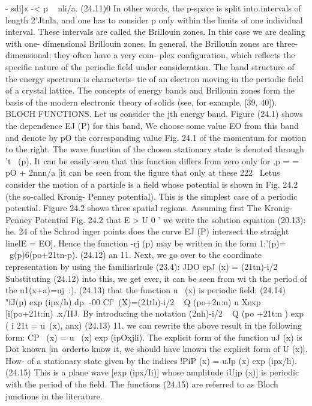 \documentclass[a4paper,sfsidenotes,colorlinks=true]{tufte-book}
\numberwithin{equation}{section}
\numberwithin{figure}{section}
\begin{document}
{{{{{-	sdi]«	-< p	~	nli/a.	(24.11)0
In other words, the p-space is split into intervals of length 2'Jtnla, and one has to consider p only within the limits of one individual interval. These intervals are called the Brillouin zones. In this case we are dealing with one- dimensional Brillouin zones. In general, the Brillouin zones are three-dimensional; they often have a very com- plex configuration, which reflects the specific nature of the periodic field under consideration.
The band structure of the energy spectrum is characteris- tic of an electron moving in the periodic field of a crystal lattice. The concepts of energy bands and Brillouin zones form the basis of the modern electronic theory of solids (see, for example, [39, 40]).
BLOCH FUNCTIONS. Let us consider the jth energy band. Figure (24.1) shows the dependence EJ (P) for this band, We choose some value EO from this band and denote by pO the corresponding value
Fig. 24.1
of the momentum for motion to the right. The wave function of the chosen stationary state is denoted through 't~ (p). It can be
easily seen that this function differs from zero only for ,p = = pO + 2nnn/a [it can be seen from the figure that only at these
222
~Letus consider the motion of a particle is a field whose potential is shown in Fig. 24.2 (the so-called Kronig- Penney potential). This is the simplest case of a periodic potential.
Figure 24.2 shows three spatial regions. Assuming first
The Kronig-Penney Potential
Fig. 24.2
that	E	>	U 0 '	we	write	the	solution equation (20.13):
he. 24
of	the
Schrod inger
points does the curve EJ (P) intersect the straight linelE = EO]. Hence the function -rj (p) may be written in the form
1;'(p)= ~g(p)6(po+21tn-p).	(24.12) an
11.
Next, we go over to the coordinate representation by using the familiarlrule (23.4):
JDO
cpJ (x) =	(21tn)-i/2 Substituting (24.12) into this, we get
ever, it can be seen from wi th	the	period	of	the
u1(x+a)=uj~:).
(24.13) that the function u~ (x) is periodic field:
(24.14)
"fJ(p) exp (ipx/h) dp.
-00
Cf'~(X)=(21th)-i/2 ~ Q (po+2n:n) n
Xexp [i(po+21t:in) .x/IIJ. By introducing the notation
(2nh)-i/2 ~ Q (po +21t:n ) exp ( i 21t	= u~(x), anx)
(24.13)
11. we can rewrite the above result in the following form: CP~ (x) = u~ (x) exp (ipOxjli).
The explicit form of the function uJ (x) is Dot known [in~orderto know it, we should have known the explicit form of U (x)]. How-
of a stationary state given by the indices !PiP (x) = uJp (x) exp (ipx/li).	(24.15)
This is a plane wave [exp (ipx/Ii)] whose amplitude iUjp (x)] is periodic with the period of the field. The functions (24.15) are referred to as Bloch junctions in the literature.
}}}}}
\end{document}
